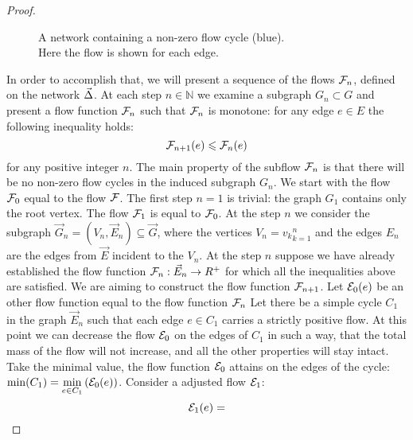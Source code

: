 \documentclass[12pt]{article}
\begin{document}
\begin{proof}
\begin{figure}
\begin{center}
        \caption{A network containing a non-zero flow cycle (blue).\\ Here the flow is shown for each edge.} 
        \label{non-zero-flow}
        \end{center}
      \end{figure}
      In order to accomplish that, we will present a sequence of the flows $\flowposn{n}$, defined on the network $\onet$.
      At each step $n \in \mathbb{N}$ we examine a subgraph $G_n \subset G$ and present a flow function $\flowposn{n}$
        such that $\flowposn{n}$ is monotone: for any edge $e \in E$ the following inequality holds:
      \[
        \flowposn{n+1}(e) \leq \flowposn{n}(e)
      \]
      for any positive integer $n$.
      The main property of the subflow $\flowposn{n}$ is that there will be no non-zero flow cycles in the induced subgraph
      $G_n$.
      We start with the flow $\flowposn{0}$ equal to the flow $\flowpos$.
      The first step $n = 1$ is trivial: the graph $G_1$ contains only the root vertex.
      The flow $\flowposn{1}$ is equal to $\flowposn{0}$.
      At the step $n$ we consider the subgraph $\vec{G}_n = (V_n, \vec{E}_n) \subseteq \vec{G}$, where the vertices
        $V_n = {v_k}_{k=1}^n$ and the edges $E_n$ are the edges from $\vec{E}$ incident to the $V_n$.
      At the step $n$ suppose we have already established the flow function $\flowposn{n}: \vec{E}_{n} \to R^{+}$ for which
        all the inequalities above are satisfied.
      We are aiming to construct the flow function $\flowposn{n+1}$.
      Let $\cal{E}_0(e)$ be an other flow function  equal to the flow function $\flowposn{n}$
      Let there be a simple cycle $C_1$ in the graph $\vec{E}_n$ such that each edge $e \in C_1$ carries
        a strictly positive flow.
      At this point we can decrease the flow $\cal{E}_0$ on the edges of $C_1$ in such a way, that the total mass
        of the flow will not increase, and all the other properties will stay intact.
      Take the minimal value, the flow function $\cal{E}_0$
        attains on the edges of the cycle: $\displaystyle\min(C_1) = \min_{e \in C_1}\left(\cal{E}_0(e)\right)$.
      Consider a adjusted flow $\cal{E}_1$:
      \begin{equation*}
        \cal{E}_1(e) =

\end{equation*}
\end{proof}
\end{document}
